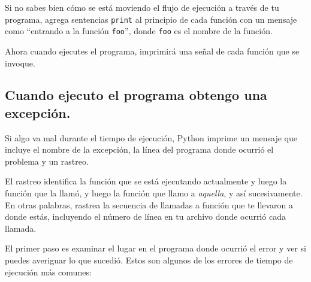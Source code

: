 \documentclass[10pt]{book}
\begin{document}
Si no sabes bien cómo se está moviendo el flujo de ejecución a través
de tu programa, agrega sentencias {\tt print} al principio de cada
función con un mensaje como ``entrando a la función {\tt foo}'', donde
{\tt foo} es el nombre de la función.

Ahora cuando ejecutes el programa, imprimirá una señal de cada
función que se invoque.


\subsection{Cuando ejecuto el programa obtengo una excepción.}

Si algo va mal durante el tiempo de ejecución, Python
imprime un mensaje que incluye el nombre de la
excepción, la línea del programa donde ocurrió el problema
y un rastreo.

El rastreo identifica la función que se está ejecutando actualmente y
luego la función que la llamó, y luego la función que llamo a
{\em aquella}, y así sucesivamente.  En otras palabras, rastrea la secuencia de
llamadas a función que te llevaron a donde estás, incluyendo el número
de línea en tu archivo donde ocurrió cada llamada.

El primer paso es examinar el lugar en el programa donde
ocurrió el error y ver si puedes averiguar lo que sucedió.
Estos son algunos de los errores de tiempo de ejecución más comunes:
\end{document}

